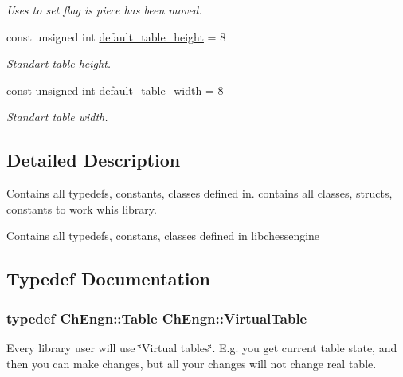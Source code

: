\begin{DoxyCompactItemize}
\begin{DoxyCompactList}\small\item\em Uses to set flag is piece has been moved. \item\end{DoxyCompactList}\item 
\hypertarget{namespaceChEngn_ae87757a4f2d9ae9e25d48213cad79ddd}{
const unsigned int \hyperlink{namespaceChEngn_ae87757a4f2d9ae9e25d48213cad79ddd}{default\_\-table\_\-height} = 8}
\label{namespaceChEngn_ae87757a4f2d9ae9e25d48213cad79ddd}

\begin{DoxyCompactList}\small\item\em Standart table height. \item\end{DoxyCompactList}\item 
\hypertarget{namespaceChEngn_a9dc4a83c122aec6e170ad7a1d40efd8a}{
const unsigned int \hyperlink{namespaceChEngn_a9dc4a83c122aec6e170ad7a1d40efd8a}{default\_\-table\_\-width} = 8}
\label{namespaceChEngn_a9dc4a83c122aec6e170ad7a1d40efd8a}

\begin{DoxyCompactList}\small\item\em Standart table width. \item\end{DoxyCompactList}\end{DoxyCompactItemize}


\subsection{Detailed Description}
Contains all typedefs, constants, classes defined in. contains all classes, structs, constants to work whis library.

Contains all typedefs, constans, classes defined in libchessengine 

\subsection{Typedef Documentation}
\hypertarget{namespaceChEngn_a5ba229504d25ed1b2086f1df62f6db41}{
\subsubsection[{VirtualTable}]{\setlength{\rightskip}{0pt plus 5cm}typedef {\bf ChEngn::Table} {\bf ChEngn::VirtualTable}}}
\label{namespaceChEngn_a5ba229504d25ed1b2086f1df62f6db41}
Every library user will use \char`\"{}Virtual tables\char`\"{}. E.g. you get current table state, and then you can make changes, but all your changes will not change real table. 

